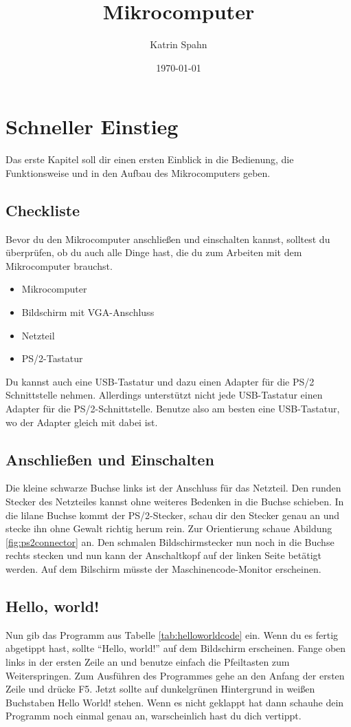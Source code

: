 \documentclass[10pt]{book}
\title{Mikrocomputer}
\author{Katrin Spahn}
\date{\today}
\begin{document}
\maketitle

\tableofcontents

\chapter{Schneller Einstieg}

Das erste Kapitel soll dir einen ersten Einblick
in die Bedienung, die Funktionsweise
und in den Aufbau des Mikrocomputers geben.

\section{Checkliste}
Bevor du den Mikrocomputer anschließen und einschalten
kannst, solltest du überprüfen, ob du auch alle Dinge
hast, die du zum Arbeiten mit dem Mikrocomputer brauchst.

\begin{itemize}
\item Mikrocomputer
\item Bildschirm mit VGA-Anschluss
\item Netzteil
\item PS/2-Tastatur 

\end{itemize}
Du kannst auch eine USB-Tastatur
und dazu einen Adapter für die
PS/2 Schnittstelle nehmen.
Allerdings unterstützt nicht jede USB-Tastatur
einen Adapter für die PS/2-Schnittstelle.
Benutze also am besten eine USB-Tastatur,
wo der Adapter gleich mit dabei ist.


\section{Anschließen und Einschalten}

Die kleine schwarze Buchse links
ist der Anschluss für das Netzteil.
Den runden Stecker des Netzteiles kannst
ohne weiteres Bedenken in die Buchse schieben.
In die lilane Buchse kommt der PS/2-Stecker,
schau dir den Stecker genau an und stecke ihn
ohne Gewalt richtig herum rein.
Zur Orientierung schaue
Abildung \ref{fig:ps2connector} an.
Den schmalen Bildschirmstecker nun noch
in die Buchse rechts stecken
und nun kann der Anschaltkopf
auf der linken Seite betätigt werden.
Auf dem Bilschirm müsste der
Maschinencode-Monitor erscheinen.

\section{Hello, world!}
Nun gib das Programm aus
Tabelle \ref{tab:helloworldcode} ein.
Wenn du es fertig abgetippt hast,
sollte ``Hello, world!'' auf dem Bildschirm erscheinen.
Fange oben links in der ersten Zeile an
und benutze einfach die Pfeiltasten zum Weiterspringen.
Zum Ausführen des Programmes gehe an den Anfang der ersten Zeile und drücke F5.
Jetzt sollte auf dunkelgrünen Hintergrund in weißen Buchstaben
Hello World! stehen. Wenn es nicht geklappt hat dann schauhe dein Programm
noch einmal genau an, warscheinlich hast du dich vertippt.
\end{document}
